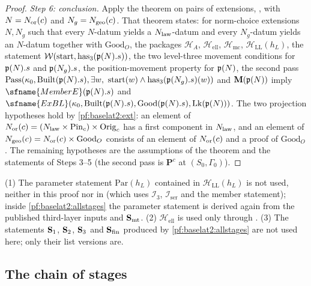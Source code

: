 \begin{proof}
\emph{Step 6: conclusion.} Apply the theorem on pairs of extensions,
, with $N=N_{\mathrm{or}}(c)$ and
$N_g=N_{\mathrm{geo}}(c)$. That theorem states: for norm-choice extensions $N,N_g$ such that every $N$-datum
yields a $N_{\mathrm{law}}$-datum and every $N_g$-datum yields an $N$-datum together with $\mathrm{Good}_O$, the
packages $\mathcal{H}_{A}$, $\mathcal{H}_{\mathrm{ell}}$, $\mathcal{H}_{\mathrm{mc}}$,
$\mathcal{H}_{\mathrm{LL}}(h_L)$, the statement $\mathcal{W}(\mathrm{start},\mathrm{has}_3(\mathfrak{p}(N).s))$,
the two level-three movement conditions for $\mathfrak{p}(N).s$ and $\mathfrak{p}(N_g).s$, the position-movement property for $\mathfrak{p}(N)$,
the second pass
$\mathrm{Pass}(\kappa_0,\mathrm{Built}(\mathfrak{p}(N).s),\exists w,\ \mathrm{start}(w)\wedge\mathrm{has}_3(\mathfrak{p}(N_g).s)(w))$
and $\mathbf{M}(\mathfrak{p}(N))$ imply $\sfname{MemberE}(\bltwop(N).s)$ and
$\sfname{ExBL}(\kappa_0,\mathrm{Built}(\bltwop(N).s),\mathrm{Good}(\bltwop(N).s),\mathrm{Lk}(\bltwop(N)))$.
The two projection hypotheses hold by \cref{pf:baselat2:ext}: an element of
$N_{\mathrm{or}}(c)=(N_{\mathrm{law}}\times\mathrm{Pin}_c)\times\mathrm{Orig}_c$ has a first component in
$N_{\mathrm{law}}$, and an element of $N_{\mathrm{geo}}(c)=N_{\mathrm{or}}(c)\times\mathrm{Good}_O$ consists of an element
of $N_{\mathrm{or}}(c)$ and a proof of $\mathrm{Good}_O$. The remaining hypotheses are the assumptions of the
theorem and the statements of Steps 3--5 (the second pass is $\mathbf{P}^{c}$ at $(S_0,\Gamma_0)$).
\end{proof}

\begin{remark}\label{pf:baselat2:rem:main}
(1) The parameter statement $\mathrm{Par}(h_L)$ contained in $\mathcal{H}_{\mathrm{LL}}(h_L)$ is
not used, neither in this proof nor in 
(which uses $\mathcal I_3$, $\mathcal I_{\mathrm{ser}}$ and the member statement); inside
\cref{pf:baselat2:allstages} the parameter statement is derived again from the published third-layer
inputs and $\mathbf{S}_{\mathrm{mt}}$. (2) $\mathcal{H}_{\mathrm{ell}}$ is used only through
. (3) The statements
$\mathbf{S}_{\mathrm{1}}$, $\mathbf{S}_{\mathrm{2}}$, $\mathbf{S}_{\mathrm{3}}$ and $\mathbf{S}_{\mathrm{fin}}$ produced by
\cref{pf:baselat2:allstages} are not used here; only their list versions are.
\end{remark}

\subsection{The chain of stages}\label{sec:pf:baselat2:chain}

